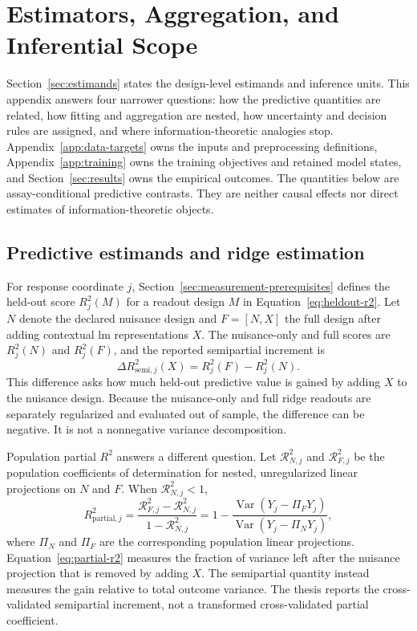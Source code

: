 \section{Estimators, Aggregation, and Inferential Scope}
\label{app:inference}

Section~\ref{sec:estimands} states the design-level estimands and inference units.
This appendix answers four narrower questions: how the predictive quantities are related, how fitting and aggregation are nested, how uncertainty and decision rules are assigned, and where information-theoretic analogies stop.
Appendix~\ref{app:data-targets} owns the inputs and preprocessing definitions, Appendix~\ref{app:training} owns the training objectives and retained model states, and Section~\ref{sec:results} owns the empirical outcomes.
The quantities below are assay-conditional predictive contrasts.
They are neither causal effects nor direct estimates of information-theoretic objects.

\subsection{Predictive estimands and ridge estimation}

For response coordinate \(j\), Section~\ref{sec:measurement-prerequisites} defines the held-out score \(R_j^2(M)\) for a readout design \(M\) in Equation~\ref{eq:heldout-r2}.
Let \(N\) denote the declared nuisance design and \(F=[N,X]\) the full design after adding contextual \ac{lm} representations \(X\).
The nuisance-only and full scores are \(R_j^2(N)\) and \(R_j^2(F)\), and the reported semipartial increment is
\[
  \Delta R_{\mathrm{semi},j}^2(X)
  =
  R_j^2(F)-R_j^2(N).
\]
This difference asks how much held-out predictive value is gained by adding \(X\) to the nuisance design.
Because the nuisance-only and full ridge readouts are separately regularized and evaluated out of sample, the difference can be negative.
It is not a nonnegative variance decomposition. 

Population partial \(R^2\) answers a different question.
Let \(\mathcal R_{N,j}^2\) and \(\mathcal R_{F,j}^2\) be the population coefficients of determination for nested, unregularized linear projections on \(N\) and \(F\).
When \(\mathcal R_{N,j}^2<1\),
\begin{equation}
  R_{\mathrm{partial},j}^2
  =
  \frac{\mathcal R_{F,j}^2-\mathcal R_{N,j}^2}
       {1-\mathcal R_{N,j}^2}
  =
  1-
  \frac{\operatorname{Var}\!\left(Y_j-\Pi_FY_j\right)}
       {\operatorname{Var}\!\left(Y_j-\Pi_NY_j\right)},
  \label{eq:partial-r2}
\end{equation}
where \(\Pi_N\) and \(\Pi_F\) are the corresponding population linear projections.
Equation~\ref{eq:partial-r2} measures the fraction of variance left after the nuisance projection that is removed by adding \(X\).
The semipartial quantity instead measures the gain relative to total outcome variance.
The thesis reports the cross-validated semipartial increment, not a transformed cross-validated partial coefficient.

